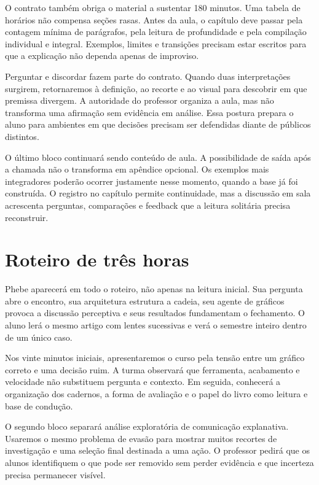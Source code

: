 O contrato também obriga o material a sustentar 180 minutos. Uma tabela de horários não compensa seções rasas. Antes da aula, o capítulo deve passar pela contagem mínima de parágrafos, pela leitura de profundidade e pela compilação individual e integral. Exemplos, limites e transições precisam estar escritos para que a explicação não dependa apenas de improviso.

Perguntar e discordar fazem parte do contrato. Quando duas interpretações surgirem, retornaremos à definição, ao recorte e ao visual para descobrir em que premissa divergem. A autoridade do professor organiza a aula, mas não transforma uma afirmação sem evidência em análise. Essa postura prepara o aluno para ambientes em que decisões precisam ser defendidas diante de públicos distintos.

O último bloco continuará sendo conteúdo de aula. A possibilidade de saída após a chamada não o transforma em apêndice opcional. Os exemplos mais integradores poderão ocorrer justamente nesse momento, quando a base já foi construída. O registro no capítulo permite continuidade, mas a discussão em sala acrescenta perguntas, comparações e feedback que a leitura solitária precisa reconstruir.

\section{Roteiro de três horas}

Phebe aparecerá em todo o roteiro, não apenas na leitura inicial. Sua pergunta abre o encontro, sua arquitetura estrutura a cadeia, seu agente de gráficos provoca a discussão perceptiva e seus resultados fundamentam o fechamento. O aluno lerá o mesmo artigo com lentes sucessivas e verá o semestre inteiro dentro de um único caso.

Nos vinte minutos iniciais, apresentaremos o curso pela tensão entre um gráfico correto e uma decisão ruim. A turma observará que ferramenta, acabamento e velocidade não substituem pergunta e contexto. Em seguida, conhecerá a organização dos cadernos, a forma de avaliação e o papel do livro como leitura e base de condução.

O segundo bloco separará análise exploratória de comunicação explanativa. Usaremos o mesmo problema de evasão para mostrar muitos recortes de investigação e uma seleção final destinada a uma ação. O professor pedirá que os alunos identifiquem o que pode ser removido sem perder evidência e que incerteza precisa permanecer visível.

